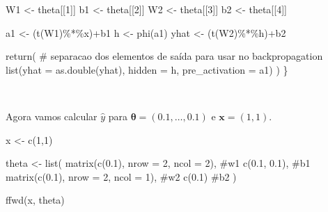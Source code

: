 \documentclass[
  a4paperpaper,
]{article}
\newenvironment{Shaded}{\begin{snugshade}}{\end{snugshade}}
\newcommand{\AttributeTok}[1]{\textcolor[rgb]{0.40,0.45,0.13}{#1}}
\newcommand{\CommentTok}[1]{\textcolor[rgb]{0.37,0.37,0.37}{#1}}
\newcommand{\DecValTok}[1]{\textcolor[rgb]{0.68,0.00,0.00}{#1}}
\newcommand{\FloatTok}[1]{\textcolor[rgb]{0.68,0.00,0.00}{#1}}
\newcommand{\FunctionTok}[1]{\textcolor[rgb]{0.28,0.35,0.67}{#1}}
\newcommand{\NormalTok}[1]{\textcolor[rgb]{0.00,0.23,0.31}{#1}}
\newcommand{\OtherTok}[1]{\textcolor[rgb]{0.00,0.23,0.31}{#1}}
\newcommand{\SpecialCharTok}[1]{\textcolor[rgb]{0.37,0.37,0.37}{#1}}
\begin{document}
\begin{Shaded}
\begin{Highlighting}[]
\NormalTok{  W1 }\OtherTok{\textless{}{-}}\NormalTok{ theta[[}\DecValTok{1}\NormalTok{]]}
\NormalTok{  b1 }\OtherTok{\textless{}{-}}\NormalTok{ theta[[}\DecValTok{2}\NormalTok{]]}
\NormalTok{  W2 }\OtherTok{\textless{}{-}}\NormalTok{ theta[[}\DecValTok{3}\NormalTok{]]}
\NormalTok{  b2 }\OtherTok{\textless{}{-}}\NormalTok{ theta[[}\DecValTok{4}\NormalTok{]]}
  
\NormalTok{  a1 }\OtherTok{\textless{}{-}}\NormalTok{ (}\FunctionTok{t}\NormalTok{(W1)}\SpecialCharTok{\%*\%}\NormalTok{x)}\SpecialCharTok{+}\NormalTok{b1}
\NormalTok{  h }\OtherTok{\textless{}{-}} \FunctionTok{phi}\NormalTok{(a1)}
\NormalTok{  yhat }\OtherTok{\textless{}{-}}\NormalTok{ (}\FunctionTok{t}\NormalTok{(W2)}\SpecialCharTok{\%*\%}\NormalTok{h)}\SpecialCharTok{+}\NormalTok{b2}
  
  \FunctionTok{return}\NormalTok{( }\CommentTok{\# separacao dos elementos de saída para usar no backpropagation}
    \FunctionTok{list}\NormalTok{(}\AttributeTok{yhat =} \FunctionTok{as.double}\NormalTok{(yhat),}
         \AttributeTok{hidden =}\NormalTok{ h,}
         \AttributeTok{pre\_activation =}\NormalTok{ a1)}
\NormalTok{  )}
\NormalTok{\}}
\end{Highlighting}
\end{Shaded}

~

Agora vamos calcular \(\hat{y}\) para
\(\boldsymbol{\theta} = (0.1, \dots , 0.1)\) e
\(\boldsymbol{x} = (1, 1)\).

\begin{Shaded}
\begin{Highlighting}[]
\NormalTok{x }\OtherTok{\textless{}{-}} \FunctionTok{c}\NormalTok{(}\DecValTok{1}\NormalTok{,}\DecValTok{1}\NormalTok{)}

\NormalTok{theta }\OtherTok{\textless{}{-}} \FunctionTok{list}\NormalTok{(}
  \FunctionTok{matrix}\NormalTok{(}\FunctionTok{c}\NormalTok{(}\FloatTok{0.1}\NormalTok{), }\AttributeTok{nrow =} \DecValTok{2}\NormalTok{, }\AttributeTok{ncol =} \DecValTok{2}\NormalTok{), }\CommentTok{\#w1}
  \FunctionTok{c}\NormalTok{(}\FloatTok{0.1}\NormalTok{, }\FloatTok{0.1}\NormalTok{), }\CommentTok{\#b1}
  \FunctionTok{matrix}\NormalTok{(}\FunctionTok{c}\NormalTok{(}\FloatTok{0.1}\NormalTok{), }\AttributeTok{nrow =} \DecValTok{2}\NormalTok{, }\AttributeTok{ncol =} \DecValTok{1}\NormalTok{), }\CommentTok{\#w2}
  \FunctionTok{c}\NormalTok{(}\FloatTok{0.1}\NormalTok{) }\CommentTok{\#b2}
\NormalTok{)}

\FunctionTok{ffwd}\NormalTok{(x, theta)}
\end{Highlighting}
\end{Shaded}
\end{document}
